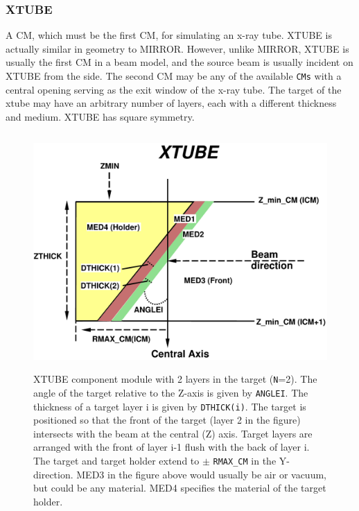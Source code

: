 \documentclass[12pt,twoside]{article}
\begin{document}
\newpage
\subsubsection{XTUBE}
\renewcommand{\rightmark}{XTUBE CM}

A CM, which must be the first CM, for simulating an x-ray tube.  XTUBE is actually
similar in geometry to MIRROR.  However, unlike MIRROR, XTUBE is usually
the first CM in a beam model, and the source beam is usually incident on XTUBE
from the side.  The second CM may be any of the available  \verb+CMs+ with a
central opening serving as the exit
window of the x-ray tube.  The target of the xtube may
have an arbitrary number of layers, each with a different thickness and
medium.  XTUBE has square
symmetry.

\begin{figure}[htbp]
\begin{center}
\leavevmode
\mbox{}\hspace{0cm}
\includegraphics[height=9cm]{figures/xtubed}
\caption[XTUBE CM geometry.]
{XTUBE component module with 2 layers in the target ({\tt N}=2).
The angle of the target relative to the Z-axis is given by {\tt ANGLEI}.  The
thickness of a target layer i is given by {\tt DTHICK(i)}.  The target is
positioned so that the front of the target (layer 2 in the figure)
intersects with the beam at the central (Z) axis.  Target layers are
arranged with the front of layer i-1 flush with the back of layer i.
The target and target holder extend to $\pm$ {\tt RMAX\_CM} in the Y-direction.
MED3 in the figure above would usually be air or vacuum, but could be any
material.  MED4 specifies the material of the target holder.}
\label{fig_XTUBED}
\end{center}
\end{figure}
\clearpage
\end{document}
